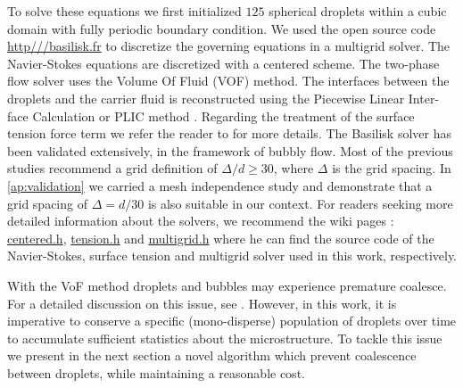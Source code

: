 To solve these equations we first initialized $125$ spherical droplets within a cubic domain with fully periodic boundary condition. 
We used the open source code \url{http///basilisk.fr} to discretize the governing equations in a multigrid solver. 
The Navier-Stokes equations are discretized with a centered scheme.
The two-phase flow solver uses the Volume Of Fluid (VOF) method. 
The interfaces between the droplets and the carrier fluid is reconstructed using the Piecewise Linear Inter-face Calculation or PLIC method \citet[Chapter 5.]{tryggvason2011direct}.
Regarding the treatment of the surface tension force term we refer the reader to \citet{popinet2018numerical} for more details. 
The Basilisk solver has been validated extensively, in the framework of bubbly flow. 
Most of the previous studies \citep{hidman2023assessing,innocenti2020direct} recommend a grid definition of $\Delta/d \ge  30$, where $\Delta$ is the grid spacing. 
In \ref{ap:validation} we carried a mesh independence study and demonstrate that a grid spacing of $\Delta = d/30$ is also suitable in our context.
For readers seeking more detailed information about the solvers, we recommend the wiki pages : \href{http://basilisk.fr/src/navier-stokes/centered.h}{centered.h}, \href{http://basilisk.fr/src/tension.h}{tension.h} and \href{http://basilisk.fr/src/grid/multigrid.h}{multigrid.h} where he can find the source code of the Navier-Stokes, surface tension and multigrid solver used in this work, respectively. 

With the VoF method droplets and bubbles may experience premature coalesce.
For a detailed discussion on this issue, see  \citet[Appendix B]{innocenti2020direct}.
However, in this work, it is imperative to conserve a specific (mono-disperse) population of droplets over time to accumulate sufficient statistics about the microstructure.
To tackle this issue we present in the next section a novel algorithm which prevent coalescence between droplets, while maintaining a reasonable cost. 






